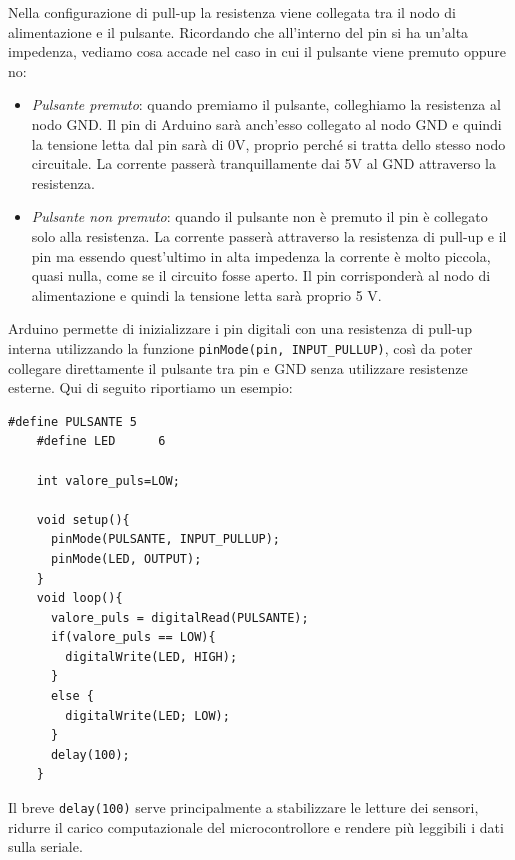 \documentclass[12pt, letterpaper]{book}
\begin{document}
    Nella configurazione di pull-up la resistenza viene collegata tra il nodo di alimentazione e il pulsante. Ricordando che all'interno del pin si ha un'alta impedenza, vediamo cosa accade nel caso in cui il pulsante viene premuto oppure no:
    \begin{itemize}[leftmargin=1.2cm, itemsep=1pt, topsep=5pt]
      \item \textit{Pulsante premuto}: quando premiamo il pulsante, colleghiamo la resistenza al nodo GND. Il pin di Arduino sarà anch'esso collegato al nodo GND e quindi la tensione letta dal pin sarà di 0V, proprio perché si tratta dello stesso nodo circuitale. La corrente passerà tranquillamente dai 5V al GND attraverso la resistenza.
      \item \textit{Pulsante non premuto}: quando il pulsante non è premuto il pin è collegato solo alla resistenza. La corrente passerà attraverso la resistenza di pull-up e il pin ma essendo quest'ultimo in alta impedenza la corrente è molto piccola, quasi nulla, come se il circuito fosse aperto. Il pin corrisponderà al nodo di alimentazione e quindi la tensione letta sarà proprio 5 V.
    \end{itemize}

    Arduino permette di inizializzare i pin digitali con una resistenza di pull-up interna utilizzando la funzione \lstinline[style=myArduino]{pinMode(pin, INPUT_PULLUP)}, così da poter collegare direttamente il pulsante tra pin e GND senza utilizzare resistenze esterne. Qui di seguito riportiamo un esempio:

    \begin{lstlisting}[style=myArduino, basicstyle=\ttfamily\footnotesize, caption={Esempio pulsante}, captionpos=b, label=code:pulsante]
    #define PULSANTE 5
    #define LED      6
    
    int valore_puls=LOW;

    void setup(){
      pinMode(PULSANTE, INPUT_PULLUP);
      pinMode(LED, OUTPUT);
    }
    void loop(){
      valore_puls = digitalRead(PULSANTE);
      if(valore_puls == LOW){
        digitalWrite(LED, HIGH);
      }
      else {
        digitalWrite(LED; LOW);
      }
      delay(100);
    }
    \end{lstlisting}

    Il breve \lstinline[style=myArduino]{delay(100)} serve principalmente a stabilizzare le letture dei sensori, ridurre il carico computazionale del microcontrollore e rendere più leggibili i dati sulla seriale. 
\end{document}
